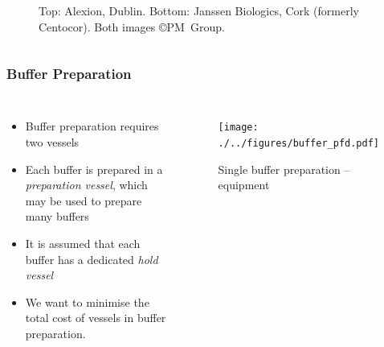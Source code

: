 \documentclass{beamer}
\begin{document}
\begin{frame}
\begin{columns}
\begin{figure}
            \caption{\scriptsize Top: Alexion, Dublin. Bottom:
                Janssen Biologics, Cork (formerly Centocor).
                Both images \copyright PM~Group.}
        \end{figure}
    \end{columns}
\end{frame}

\begin{frame}
    \frametitle{Buffer Preparation}
    \begin{columns}
        \begin{itemize}
            \item Buffer preparation requires two vessels
            \item Each buffer is prepared in a \emph{preparation vessel}, which
                may be used to prepare many buffers
            \item It is assumed that each buffer has a dedicated \emph{hold
                vessel}
            \item We want to minimise the total cost of vessels in buffer
                preparation.
        \end{itemize}
        \begin{figure}
            \centering
            \texttt{[image: ./../figures/buffer\_pfd.pdf]}
            \caption{\scriptsize Single buffer preparation -- equipment}
        \end{figure}
    \end{columns}
\end{frame}
\end{document}
